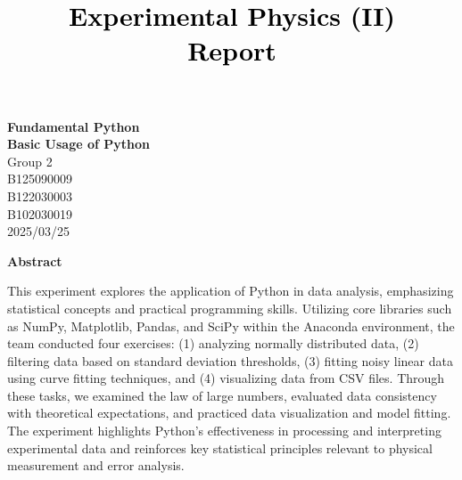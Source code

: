 \documentclass[12pt,a4paper]{article}
\title{\vspace{-0.5cm}
       {\bf \textcolor{black}{{\LARGE 
       \begin{CJK}{UTF8}{bkai}
       Experimental Physics (II)\\
       \vspace{6pt}
        Report\\
       \end{CJK}
       }}
       }
       }
\author{}
\date{}
\begin{document}
\begin{CJK}{UTF8}{bkai}

\maketitle
\thispagestyle{empty}

\vspace{10cm}
\begin{center}
{\bf \LARGE \vspace{-11cm} Fundamental Python\\
\vspace{0.25cm}Basic Usage of Python}\\
\vspace{13cm}
{\large Group 2}\\ \vspace{12pt}
{\large {} B125090009}\\ \vspace{6pt}
{\large {}  B122030003}\\ \vspace{6pt}
{\large {} B102030019}\\ \vspace{12pt}
{\large 2025/03/25}\\
\end{center}

\clearpage


\vspace{1cm}
\begin{center}
{\large\bf\sc Abstract}
\end{center}

\noindent 

This experiment explores the application of Python in data analysis, emphasizing statistical concepts and practical programming skills. Utilizing core libraries such as NumPy, Matplotlib, Pandas, and SciPy within the Anaconda environment, the team conducted four exercises: (1) analyzing normally distributed data, (2) filtering data based on standard deviation thresholds, (3) fitting noisy linear data using curve fitting techniques, and (4) visualizing data from CSV files. Through these tasks, we examined the law of large numbers, evaluated data consistency with theoretical expectations, and practiced data visualization and model fitting. The experiment highlights Python’s effectiveness in processing and interpreting experimental data and reinforces key statistical principles relevant to physical measurement and error analysis.


\end{CJK}
\end{document}

